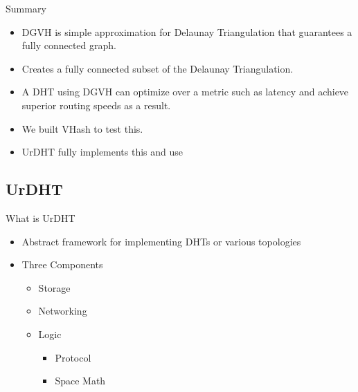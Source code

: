\documentclass[11pt]{beamer}
\begin{document}
\begin{frame}{Summary}
	\begin{itemize}
		\item DGVH is simple approximation for Delaunay Triangulation that guarantees a fully connected graph.
		\item  Creates a fully connected subset of the Delaunay Triangulation.
		\item A DHT using DGVH can optimize over a metric such as latency and achieve superior routing speeds as a result.
		\item We built VHash to test this.
		\item UrDHT fully implements this and use
	\end{itemize}
\end{frame}		




\subsection{UrDHT}

\begin{frame}{What is UrDHT}
	\begin{itemize}
		\item Abstract framework for implementing DHTs or various topologies
		\item Three Components
		\begin{itemize}
			\item Storage 
			\item Networking
			\item Logic
			\begin{itemize}
				\item Protocol
				\item Space Math
			\end{itemize}
		\end{itemize}
	\end{itemize}
\end{frame}
\end{document}
